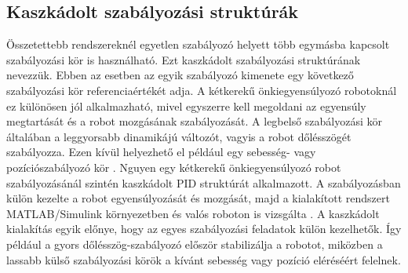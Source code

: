 \documentclass[12pt,a4paper]{report}
\begin{document}
	\subsection{Kaszkádolt szabályozási struktúrák}
	Összetettebb rendszereknél egyetlen szabályozó helyett több egymásba kapcsolt szabályozási kör is használható. Ezt kaszkádolt szabályozási struktúrának nevezzük. Ebben az esetben az egyik szabályozó kimenete egy következő szabályozási kör referenciaértékét adja.
	\newline
	\newline
	A kétkerekű önkiegyensúlyozó robotoknál ez különösen jól alkalmazható, mivel egyszerre kell megoldani az egyensúly megtartását és a robot mozgásának szabályozását. A legbelső szabályozási kör általában a leggyorsabb dinamikájú változót, vagyis a robot dőlésszögét szabályozza. Ezen kívül helyezhető el például egy sebesség- vagy pozíciószabályozó kör \cite{nguyen2017,zhangnor2025}.
	\newline
	\newline
	Nguyen egy kétkerekű önkiegyensúlyozó robot szabályozásánál szintén kaszkádolt PID struktúrát alkalmazott. A szabályozásban külön kezelte a robot egyensúlyozását és mozgását, majd a kialakított rendszert MATLAB/Simulink környezetben és valós roboton is vizsgálta \cite{nguyen2017}.
	\newline
	\newline
	A kaszkádolt kialakítás egyik előnye, hogy az egyes szabályozási feladatok külön kezelhetők. Így például a gyors dőlésszög-szabályozó először stabilizálja a robotot, miközben a lassabb külső szabályozási körök a kívánt sebesség vagy pozíció eléréséért felelnek.
\end{document}
